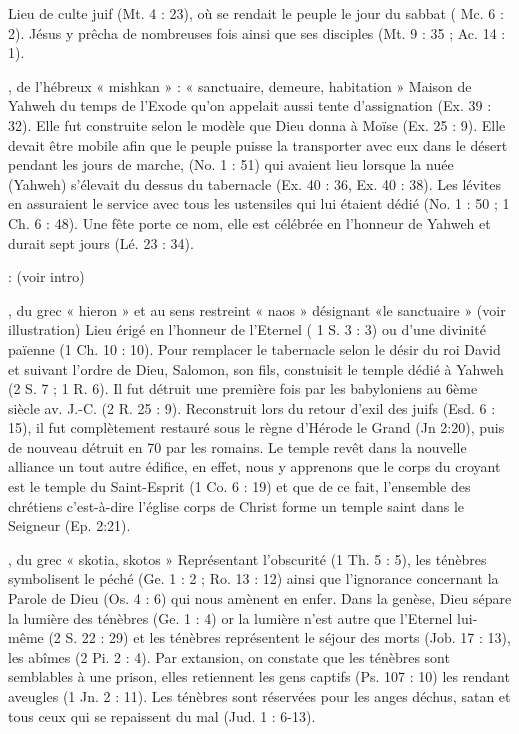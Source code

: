 \begin{multicols}{2}
Lieu de culte juif (Mt. 4 : 23), où se rendait le peuple le jour du sabbat ( Mc. 6 : 2). Jésus y prêcha de nombreuses fois ainsi que ses disciples (Mt. 9 : 35 ; Ac. 14 : 1).


, de l'hébreux « mishkan » : « sanctuaire, demeure, habitation »
Maison de Yahweh du temps de l'Exode qu'on appelait aussi tente d'assignation (Ex. 39 : 32). Elle fut construite selon le modèle que Dieu donna à Moïse (Ex. 25 : 9). Elle devait être mobile afin que le peuple puisse la transporter avec eux dans le désert pendant les jours de marche, (No. 1 : 51) qui avaient lieu lorsque la nuée (Yahweh) s'élevait du dessus du tabernacle (Ex. 40 : 36, Ex. 40 : 38). Les lévites en assuraient le service avec tous les ustensiles qui lui étaient dédié (No. 1 : 50 ; 1 Ch. 6 : 48). Une fête porte ce nom, elle est célébrée en l'honneur de Yahweh et durait sept jours (Lé. 23 : 34).


: (voir intro)


, du grec « hieron » et au sens restreint « naos » désignant «le sanctuaire » (voir illustration)
Lieu érigé en l'honneur de l'Eternel ( 1 S. 3 : 3) ou d'une divinité païenne (1 Ch. 10 : 10). Pour remplacer le tabernacle selon le désir du roi David et suivant l'ordre de Dieu, Salomon, son fils, constuisit le temple dédié à Yahweh (2 S. 7 ; 1 R. 6). Il fut détruit une première fois par les babyloniens au 6ème siècle av. J.-C. (2 R. 25 : 9). Reconstruit lors du retour d'exil des juifs (Esd. 6 : 15), il fut complètement restauré sous le règne d'Hérode le Grand (Jn 2:20), puis de nouveau détruit en 70 par les romains. Le temple revêt dans la nouvelle alliance un tout autre édifice, en effet, nous y apprenons que le corps du croyant est le temple du Saint-Esprit (1 Co. 6 : 19) et que de ce fait, l'ensemble des chrétiens c'est-à-dire l'église corps de Christ forme un temple saint dans le Seigneur (Ep. 2:21).


, du grec « skotia, skotos »
Représentant l'obscurité (1 Th. 5 : 5), les ténèbres symbolisent le péché (Ge. 1 : 2 ; Ro. 13 : 12) ainsi que l'ignorance concernant la Parole de Dieu (Os. 4 : 6) qui nous amènent en enfer. Dans la genèse, Dieu sépare la lumière des ténèbres (Ge. 1 : 4) or la lumière n'est autre que l'Eternel lui-même (2 S. 22 : 29) et les ténèbres représentent le séjour des morts (Job. 17 : 13), les abîmes (2 Pi. 2 : 4). Par extansion, on constate que les ténèbres sont semblables à une prison, elles retiennent les gens captifs (Ps. 107 : 10) les rendant aveugles (1 Jn. 2 : 11). Les ténèbres sont réservées pour les anges déchus, satan et tous ceux qui se repaissent du mal (Jud. 1 : 6-13).



\end{multicols}
